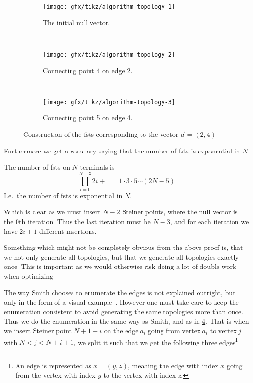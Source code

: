 \begin{figure}[htbp] \centering
  \begin{subfigure}[t]{0.267\textwidth}
    \texttt{[image: gfx/tikz/algorithm-topology-1]}
    \caption{The initial null vector.\label{fig:algorithm-topology-1}}
  \end{subfigure} ~
  \begin{subfigure}[t]{0.267\textwidth}
    \texttt{[image: gfx/tikz/algorithm-topology-2]}
    \caption{Connecting point 4 on edge 2.\label{fig:algorithm-topology-2}}
  \end{subfigure} ~
  \begin{subfigure}[t]{0.267\textwidth}
    \texttt{[image: gfx/tikz/algorithm-topology-3]}
    \caption{Connecting point 5 on edge 4.\label{fig:algorithm-topology-3}}
  \end{subfigure}
  \caption[Construction of FSTs]{Construction of the \glspl{fst} corresponding
to the vector $\vec{a} = (2, 4)$.\label{fig:algorithm-topologies}}
\end{figure}

Furthermore we get a corollary saying that the number of \glspl{fst} is
exponential in $N$

\begin{corollary}
\label{cor:number-of-fsts} The number of \glspl{fst} on $N$ terminals is
\[\prod_{i=0}^{N-3} 2i+1 = 1 \cdot 3 \cdot 5 \cdots (2N - 5)\] I.e.\ the number
of \glspl{fst} is exponential in $N$.
\end{corollary}

Which is clear as we must insert $N-2$ Steiner points, where the null vector is
the $0$th iteration.  Thus the last iteration must be $N-3$, and for each
iteration we have $2i+1$ different insertions.

Something which might not be completely obvious from the above proof is, that we
not only generate all topologies, but that we generate all topologies exactly
once.  This is important as we would otherwise risk doing a lot of double work
when optimizing.

The way Smith chooses to enumerate the edges is not explained outright, but only
in the form of a visual example~\cite[p.~143]{Smith1992}.  However one must take care to
keep the enumeration consistent to avoid generating the same topologies more
than once.  Thus we do the enumeration in the same way as Smith, and as in
\cref{fig:algorithm-topologies}.  That is when we insert Steiner point $N+1+i$
on the $\text{edge}~a_{i}$ going from $\text{vertex}~a_i$ to $\text{vertex}~j$
with $N < j < N+i+1$, we split it such that we get the following three
edges\footnote{An edge is represented as $x = (y, z)$, meaning the edge with
  index $x$ going from the vertex with index $y$ to the vertex with index
  $z$.}

